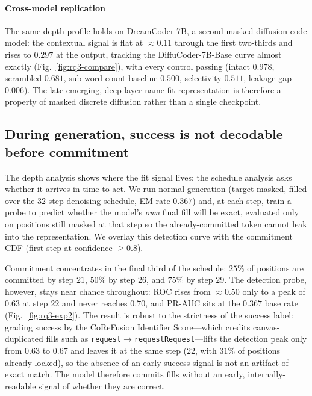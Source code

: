 \paragraph{Cross-model replication}
The same depth profile holds on DreamCoder-7B, a second masked-diffusion code
model: the contextual signal is flat at $\approx0.11$ through the first two-thirds
and rises to $0.297$ at the output, tracking the DiffuCoder-7B-Base curve almost
exactly (Fig.~\ref{fig:rq3-compare}), with every control passing (intact $0.978$,
scrambled $0.681$, sub-word-count baseline $0.500$, selectivity $0.511$, leakage
gap $0.006$). The late-emerging, deep-layer name-fit representation is therefore a
property of masked discrete diffusion rather than a single checkpoint.

\subsection{During generation, success is not decodable before commitment}
\label{sec:rq3-time}
The depth analysis shows where the fit signal lives; the schedule analysis asks
whether it arrives in time to act. We run normal generation (target masked,
filled over the $32$-step denoising schedule, EM rate $0.367$) and, at each step,
train a probe to predict whether the model's \emph{own} final fill will be exact,
evaluated only on positions still masked at that step so the already-committed
token cannot leak into the representation. We overlay this detection curve with
the commitment CDF (first step at confidence $\geq0.8$).

Commitment concentrates in the final third of the schedule: $25\%$ of positions
are committed by step $21$, $50\%$ by step $26$, and $75\%$ by step $29$. The
detection probe, however, stays near chance throughout: ROC rises from
$\approx0.50$ only to a peak of $0.63$ at step $22$ and never reaches $0.70$,
and PR-AUC sits at the $0.367$ base rate (Fig.~\ref{fig:rq3-exp2}). The result is
robust to the strictness of the success label: grading success by the CoReFusion
Identifier Score---which credits canvas-duplicated fills such as
\texttt{request}$\rightarrow$\texttt{requestRequest}---lifts the detection peak
only from $0.63$ to $0.67$ and leaves it at the same step ($22$, with $31\%$ of
positions already locked), so the absence of an early success signal is not an
artifact of exact match. The model therefore commits fills without an early,
internally-readable signal of whether they are correct.

